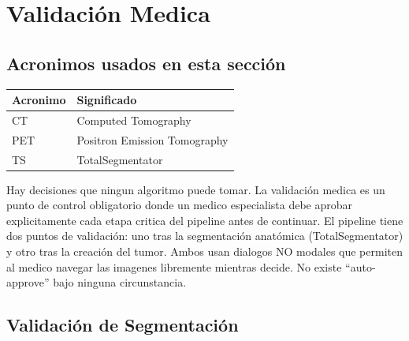 \documentclass[12pt,a4paper]{article}
\begin{document}
\begin{tcolorbox}[aiSupervisor]
\newpage


\newpage


\newpage


\newpage

\end{tcolorbox}
\section{Validación Medica}
\label{sec:validacion}

\subsection*{Acronimos usados en esta sección}
\begin{tabular}{ll}
\toprule
\textbf{Acronimo} & \textbf{Significado} \\
\midrule
CT & Computed Tomography \\
PET & Positron Emission Tomography \\
TS & TotalSegmentator \\
\bottomrule
\end{tabular}

Hay decisiones que ningun algoritmo puede tomar. La validación medica es un punto de control
obligatorio donde un medico especialista debe aprobar explicitamente cada etapa critica del
pipeline antes de continuar. El pipeline tiene dos puntos de validación: uno tras la
segmentación anatómica (TotalSegmentator) y otro tras la creación del tumor. Ambos usan
dialogos NO modales que permiten al medico navegar las imagenes libremente mientras decide.
No existe ``auto-approve'' bajo ninguna circunstancia.

\subsection{Validación de Segmentación}
\end{document}
